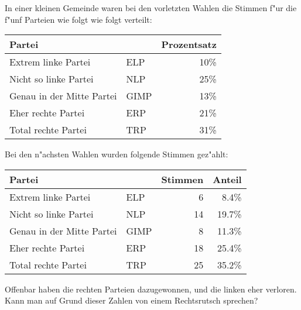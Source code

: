 In einer kleinen Gemeinde waren bei den vorletzten Wahlen die
Stimmen f"ur die f"unf Parteien wie folgt wie folgt verteilt:
\begin{center}
\begin{tabular}{ll|r}
Partei                   &    &Prozentsatz\\
\hline
Extrem linke Partei      &ELP & 10\%\\
Nicht so linke Partei    &NLP & 25\%\\
Genau in der Mitte Partei&GIMP& 13\%\\
Eher rechte Partei       &ERP & 21\%\\
Total rechte Partei      &TRP & 31\%\\
\hline
\end{tabular}
\end{center}
Bei den n"achsten Wahlen wurden folgende Stimmen gez"ahlt:
\begin{center}
\begin{tabular}{ll|rr}
Partei                   &    &Stimmen&Anteil\\
\hline
Extrem linke Partei      &ELP &  6    & 8.4\%\\
Nicht so linke Partei    &NLP & 14    &19.7\%\\
Genau in der Mitte Partei&GIMP&  8    &11.3\%\\
Eher rechte Partei       &ERP & 18    &25.4\%\\
Total rechte Partei      &TRP & 25    &35.2\%\\
\hline
\end{tabular}
\end{center}
Offenbar haben die rechten Parteien dazugewonnen, und die linken
eher verloren.
Kann man auf Grund dieser Zahlen von einem Rechtsrutsch sprechen?

